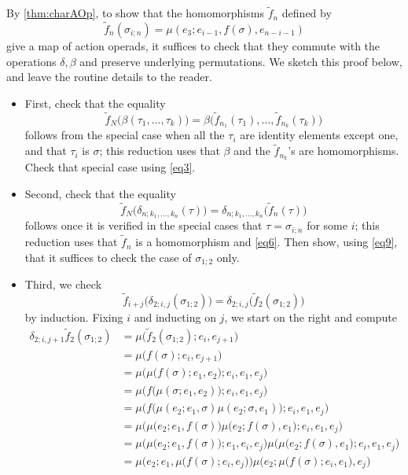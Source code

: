 \begin{example}
By \cref{thm:charAOp}, to show that the homomorphisms $\tilde{f}_n$ defined by
\[
\tilde{f}_n(\sigma_{i;n}) = \mu(e_3; e_{i-1}, f(\sigma), e_{n-i-1})
\]
give a map of action operads, it suffices to check that they commute with the operations $\delta, \beta$ and preserve underlying permutations.
We sketch this proof below, and leave the routine details to the reader.
\begin{itemize}
\item First, check that the equality
\[
\tilde{f}_N\big( \beta(\tau_1, \ldots, \tau_k) \big) = \beta\big( \tilde{f}_{n_1}(\tau_1), \ldots, \tilde{f}_{n_k}(\tau_k) \big)
\]
follows from the special case when all the $\tau_i$ are identity elements except one, and that $\tau_i$ is $\sigma$; this reduction uses that $\beta$ and the $\tilde{f}_{n_k}$'s are homomorphisms. Check that special case using \cref{eq3}.
\item Second, check that the equality
\[
\tilde{f}_N\big( \delta_{n; k_1, \ldots, k_n}(\tau) \big) = \delta_{n; k_1, \ldots, k_n}\big( \tilde{f}_n(\tau) \big) 
\]
follows once it is verified in the special cases that $\tau = \sigma_{i;n}$ for some $i$; this reduction uses that $\tilde{f}_n$ is a homomorphism and \cref{eq6}.
Then show, using \cref{eq9}, that it suffices to check the case of $\sigma_{1;2}$ only.
\item Third, we check
\[
\tilde{f}_{i+j}\big( \delta_{2; i,j}(\sigma_{1;2}) \big) = \delta_{2; i,j}\big( \tilde{f}_2(\sigma_{1;2}) \big) 
\]
by induction. Fixing $i$ and inducting on $j$, we start on the right and compute
\begin{align*}
\delta_{2; i, j+1} \tilde{f}_2(\sigma_{1;2}) & = \mu\big( \tilde{f}_2(\sigma_{1;2}); e_i, e_{j+1} \big)  \\
& = \mu \big( f(\sigma); e_i, e_{j+1} \big) \\
& = \mu \Big( \mu\big( f(\sigma); e_1, e_2 \big); e_i, e_1, e_j \Big) \\
& = \mu \Big( f\big(\mu(\sigma; e_1, e_2) \big); e_i, e_1, e_j \Big) \\
& = \mu \Big( f\big( \mu(e_2; e_1, \sigma) \mu(e_2; \sigma, e_1) \big); e_i, e_1, e_j \Big) \\
& = \mu \Big( \mu\big(e_2; e_1, f(\sigma)\big) \mu\big(e_2; f(\sigma), e_1 \big); e_i, e_1, e_j \Big) \\
& = \mu \Big( \mu\big(e_2; e_1, f(\sigma)\big); e_1, e_i, e_j\Big)
\mu\Big( \mu\big(e_2; f(\sigma), e_1 \big); e_i, e_1, e_j \Big) \\
& = \mu \Big(  e_2; e_1, \mu \big( f(\sigma); e_i, e_j \big) \Big) \mu \Big(  e_2; \mu \big( f(\sigma); e_i, e_1 \big), e_j \Big) \\

\end{align*}
\end{itemize}
\end{example}
